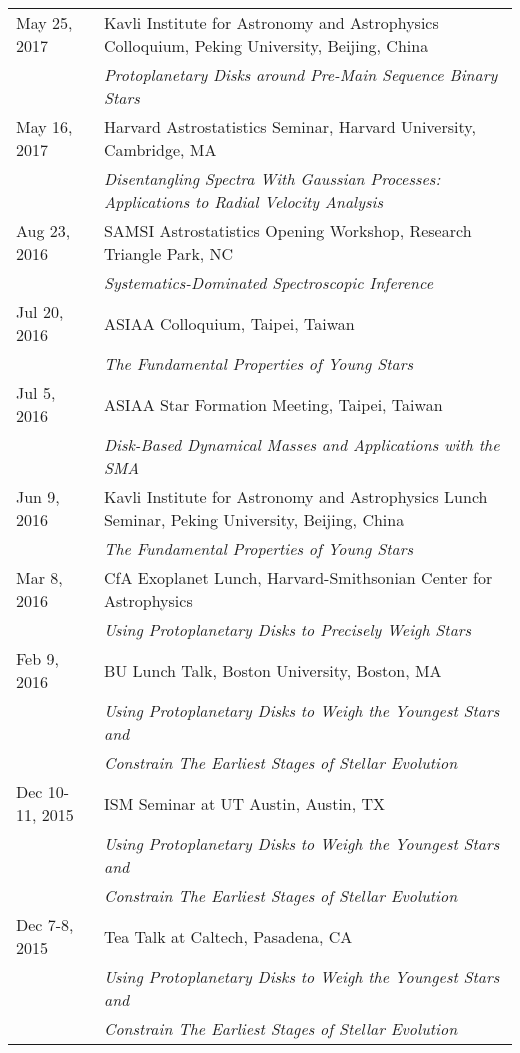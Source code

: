 \begin{longtable}{@{\hspace{10pt}}p{1.2in}l}
  May 25, 2017 & Kavli Institute for Astronomy and Astrophysics Colloquium, Peking University, Beijing, China \\
  & \emph{Protoplanetary Disks around Pre-Main Sequence Binary Stars} \\[\rowskip]
  May 16, 2017 & Harvard Astrostatistics Seminar, Harvard University, Cambridge, MA \\
  & \emph{Disentangling Spectra With Gaussian Processes: Applications to Radial Velocity Analysis} \\[\rowskip]
  Aug 23, 2016 & SAMSI Astrostatistics Opening Workshop, Research Triangle Park, NC \\
  & \emph{Systematics-Dominated Spectroscopic Inference} \\[\rowskip]
  Jul 20, 2016 & ASIAA Colloquium, Taipei, Taiwan \\
  & \emph{The Fundamental Properties of Young Stars} \\[\rowskip]
  Jul 5, 2016 & ASIAA Star Formation Meeting, Taipei, Taiwan \\
  & \emph{Disk-Based Dynamical Masses and Applications with the SMA} \\[\rowskip]
  Jun 9, 2016 & Kavli Institute for Astronomy and Astrophysics Lunch Seminar, Peking University, Beijing, China \\
  & \emph{The Fundamental Properties of Young Stars} \\[\rowskip]
  Mar 8, 2016 & CfA Exoplanet Lunch, Harvard-Smithsonian Center for Astrophysics \\
  & \emph{Using Protoplanetary Disks to Precisely Weigh Stars} \\[\rowskip]
  Feb 9, 2016 & BU Lunch Talk, Boston University, Boston, MA \\
  & \emph{Using Protoplanetary Disks to Weigh the Youngest Stars and} \\
  & \emph{Constrain The Earliest Stages of Stellar Evolution} \\[\rowskip]
  Dec 10-11, 2015 & ISM Seminar at UT Austin, Austin, TX \\
  & \emph{Using Protoplanetary Disks to Weigh the Youngest Stars and} \\
  & \emph{Constrain The Earliest Stages of Stellar Evolution} \\[\rowskip]
  Dec 7-8, 2015 & Tea Talk at Caltech, Pasadena, CA \\
  & \emph{Using Protoplanetary Disks to Weigh the Youngest Stars and} \\
  & \emph{Constrain The Earliest Stages of Stellar Evolution} \\[\rowskip]

\end{longtable}
